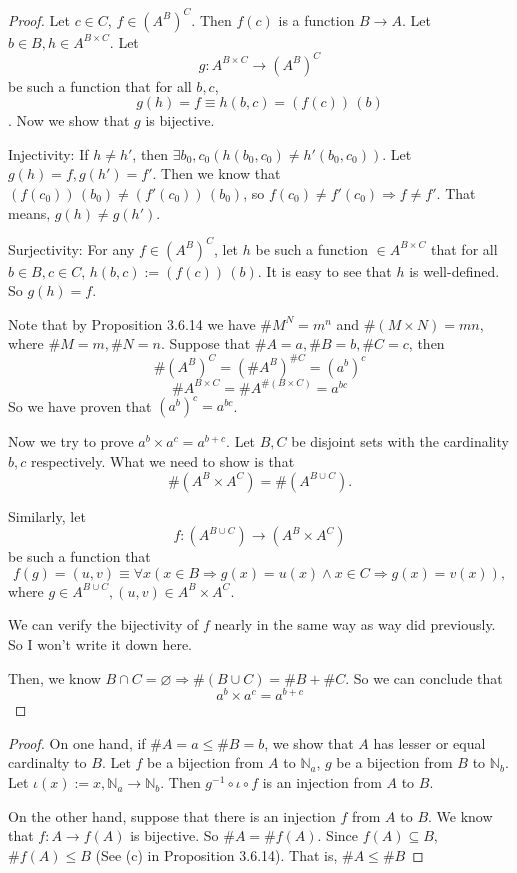 \begin{proof}
Let $c \in C$, $f \in (A^B)^C$. Then $f(c)$ is a function $B\rightarrow A$. Let 
$b \in B, h \in A^{B\times C}$. Let
\[
g:A^{B\times C} \rightarrow (A^B)^{C}
\]
be such a function that for all $b,c$,
\[
g(h) = f \equiv h(b,c) = (f(c))\,(b)
\]
. Now we show that $g$ is bijective.

Injectivity: 
If $h \neq h'$, then $\exists b_0,c_0(h(b_0,c_0) \neq h'(b_0,c_0))$. Let $g(h) =f, g(h') = f'$. Then we 
know that $(f(c_0))\,(b_0) \neq (f'(c_0))\,(b_0)$, so $f(c_0) \neq f'(c_0) \Longrightarrow f \neq f'$. 
That means, $g(h) \neq g(h')$.

Surjectivity:
For any $f \in (A^B)^{C}$, let $h$ be such a function $\in A^{B\times C}$ that for all $b \in B,c \in C$, 
$h(b,c) := (f(c))\,(b)$. It is easy to see that $h$ is well-defined. So $g(h) = f$.

Note that by Proposition 3.6.14 we have $\#M^N = m^n$ and $\#(M \times N) = mn$, where $\#M =m, \#N =n$. 
Suppose that $\#A = a, \#B = b, \#C = c$, then
\[
\#(A^B)^C = (\#A^B)^{\#C} = (a^b)^c
\]
\[
\#A^{B\times C} = \#A^{\#(B \times C)} = a^{bc}
\]
So we have proven that $(a^b)^c = a^{bc}$.

Now we try to prove $a^b \times a^c = a^{b+c}$. Let $B,C$ be disjoint sets with the cardinality $b,c$ 
respectively. What we need to show is that
\[
\#(A^B \times A^C) = \#(A^{B \cup C}).
\]

Similarly, let 
\[
f: (A^{B \cup C}) \rightarrow (A^B \times A^C)
\]
be such a function that 
\[
f(g) = (u,v) \equiv \forall x(x \in B \Rightarrow g(x) = u(x) \wedge x \in C \Rightarrow g(x) = v(x)),
\]
where $g\in A^{B \cup C}, (u,v) \in A^B \times A^C$.

We can verify the bijectivity of $f$ nearly in the same way as way did previously. So I won't write it 
down here.

Then, we know $B \cap C = \varnothing \Rightarrow \#(B \cup C) = \#B + \#C$. So we can conclude that 
\[
a^b \times a^c = a^{b+c}
\]
\end{proof}

\begin{proof}
On one hand, if $\#A = a \leq \#B = b$, we show that $A$ has lesser or equal cardinalty to $B$. Let $f$ 
be a bijection from $A$ to $\mathbb{N}_{a}$, $g$ be a bijection from $B$ to $\mathbb{N}_b$. Let 
$\iota(x):=x, \mathbb{N}_{a} \rightarrow \mathbb{N}_b$. Then $g^{-1} \circ \iota \circ f$ is an injection 
from $A$ to $B$.

On the other hand, suppose that there is an injection $f$ from $A$ to $B$. We know that 
$f:A\rightarrow f(A)$ is bijective. So $\#A = \#f(A)$. Since $f(A) \subseteq B$, $\#f(A) \leq B$ (See (c) 
in Proposition 3.6.14). That is, $\#A \leq \#B$
\end{proof}

